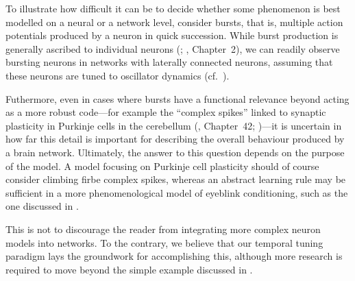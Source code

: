 To illustrate how difficult it can be to decide whether some phenomenon is best modelled on a neural or a network level, consider bursts, that is, multiple action potentials produced by a neuron in quick succession.
While burst production is generally ascribed to individual neurons (; \cite{kandel2012principles}, Chapter~2), we can readily observe bursting neurons in \NEF networks with laterally connected \LIF neurons, assuming that these neurons are tuned to oscillator dynamics (cf.~).

Futhermore, even in cases where bursts have a functional relevance beyond acting as a more robust code---for example the \enquote{complex spikes} linked to synaptic plasticity in Purkinje cells in the cerebellum (\cite{kandel2012principles}, Chapter~42; \cite{richards2019dendritic})---it is uncertain in how far this detail is important for describing the overall behaviour produced by a brain network.
Ultimately, the answer to this question depends on the purpose of the model.
A model focusing on Purkinje cell plasticity should of course consider climbing firbe complex spikes, whereas an abstract learning rule may be sufficient in a more phenomenological model of eyeblink conditioning, such as the one discussed in .

This is not to discourage the reader from integrating more complex neuron models into \NEF networks.
To the contrary, we believe that our temporal tuning paradigm lays the groundwork for accomplishing this, although more research is required to move beyond the simple \ALIF example discussed in .


